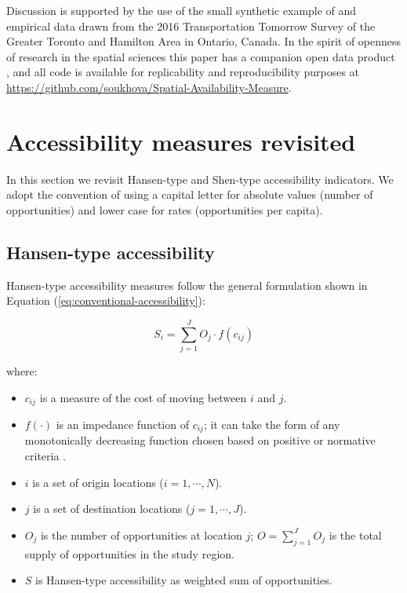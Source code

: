 \documentclass[]{elsarticle} %
\providecommand{\tightlist}{%
  \setlength{\itemsep}{0pt}\setlength{\parskip}{0pt}}
\begin{document}
Discussion is supported by the use of the small synthetic example of
\citet{shen1998} and empirical data drawn from the 2016 Transportation
Tomorrow Survey of the Greater Toronto and Hamilton Area in Ontario,
Canada. In the spirit of openness of research in the spatial sciences
\citep{brunsdon2021opening, paez2021open} this paper has a companion
open data product \citep{arribas2021Open}, and all code is available for
replicability and reproducibility purposes at
\url{https://github.com/soukhova/Spatial-Availability-Measure}.

\hypertarget{background}{%
\section{Accessibility measures revisited}\label{background}}

In this section we revisit Hansen-type and Shen-type accessibility
indicators. We adopt the convention of using a capital letter for
absolute values (number of opportunities) and lower case for rates
(opportunities per capita).

\hypertarget{hansen-type-accessibility}{%
\subsection{Hansen-type accessibility}\label{hansen-type-accessibility}}

Hansen-type accessibility measures follow the general formulation shown
in Equation (\ref{eq:conventional-accessibility}):

\begin{equation}
\label{eq:conventional-accessibility}
S_i = \sum_{j=1}^JO_j \cdot f(c_{ij})
\end{equation}

\noindent where:

\begin{itemize}
\tightlist
\item
  \(c_{ij}\) is a measure of the cost of moving between \(i\) and \(j\).
\item
  \(f(\cdot)\) is an impedance function of \(c_{ij}\); it can take the
  form of any monotonically decreasing function chosen based on positive
  or normative criteria \citep{paez2012measuring}.
\item
  \(i\) is a set of origin locations (\(i = 1,\cdots,N\)).
\item
  \(j\) is a set of destination locations (\(j = 1,\cdots,J\)).
\item
  \(O_j\) is the number of opportunities at location \(j\);
  \(O = \sum_{j=1}^J O_j\) is the total supply of opportunities in the
  study region.
\item
  \(S\) is Hansen-type accessibility as weighted sum of opportunities.
\end{itemize}
\end{document}
